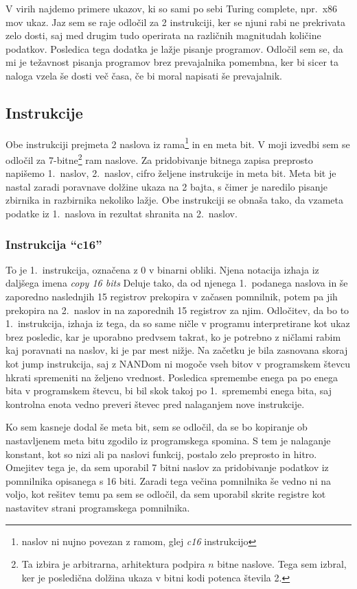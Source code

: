 \documentclass[12pt]{article}
\begin{document}
V virih najdemo primere ukazov, ki so sami po sebi Turing complete, npr.\ x86 mov ukaz.
Jaz sem se raje odločil za 2 instrukciji, ker se njuni rabi ne prekrivata zelo dosti, saj med drugim tudo operirata na različnih magnitudah količine podatkov. Posledica tega dodatka je lažje pisanje programov.
Odločil sem se, da mi je težavnost pisanja programov brez prevajalnika pomembna, ker bi sicer ta naloga vzela še dosti več časa, če bi moral napisati še prevajalnik.

\subsection{Instrukcije}
Obe instrukciji prejmeta 2 naslova iz rama\footnote{naslov ni nujno povezan z ramom, glej \textit{c16} instrukcijo} in en meta bit.
V moji izvedbi sem se odločil za 7-bitne\footnote{Ta izbira je arbitrarna, arhitektura podpira $n$ bitne naslove. Tega sem izbral, ker je posledična dolžina ukaza v bitni kodi potenca števila 2.} ram naslove.
Za pridobivanje bitnega zapisa preprosto napišemo 1.\ naslov, 2.\ naslov, cifro željene instrukcije in meta bit.
Meta bit je nastal zaradi poravnave dolžine ukaza na 2 bajta, s čimer je naredilo pisanje zbirnika in razbirnika nekoliko lažje.
Obe instrukciji se obnaša tako, da vzameta podatke iz 1.\ naslova in rezultat shranita na 2.\ naslov.

\subsubsection{Instrukcija ``c16''}
To je 1.\ instrukcija, označena z 0 v binarni obliki.
Njena notacija izhaja iz daljšega imena \textit{copy 16 bits}
Deluje tako, da od njenega 1.\ podanega naslova in še zaporedno naslednjih 15 registrov prekopira v začasen pomnilnik, potem pa jih prekopira na 2.\ naslov in na zaporednih 15 registrov za njim.
Odločitev, da bo to 1.\ instrukcija, izhaja iz tega, da so same ničle v programu interpretirane kot ukaz brez posledic, kar je uporabno predvsem takrat, ko je potrebno z ničlami rabim kaj poravnati na naslov, ki je par mest nižje.
Na začetku je bila zasnovana skoraj kot jump instrukcija, saj z NANDom ni mogoče vseh bitov v programskem števcu hkrati spremeniti na željeno vrednost.
Posledica spremembe enega pa po enega bita v programskem števcu, bi bil skok takoj po 1.\ spremembi enega bita, saj kontrolna enota vedno preveri števec pred nalaganjem nove instrukcije.

Ko sem kasneje dodal še meta bit, sem se odločil, da se bo kopiranje ob nastavljenem meta bitu zgodilo iz programskega spomina.
S tem je nalaganje konstant, kot so nizi ali pa naslovi funkcij, postalo zelo preprosto in hitro.
Omejitev tega je, da sem uporabil 7 bitni naslov za pridobivanje podatkov iz pomnilnika opisanega s 16 biti.
Zaradi tega večina pomnilnika še vedno ni na voljo, kot rešitev temu pa sem se odločil, da sem uporabil skrite registre kot nastavitev strani programskega pomnilnika.
\end{document}
